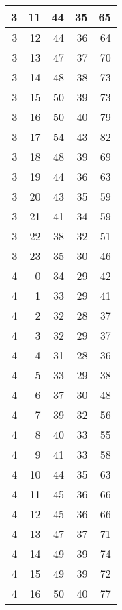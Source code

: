 \begin{longtable}{|r|r|r|r|r|}
    3     & 11    & 44    & 35    & 65 \\\hline
    3     & 12    & 44    & 36    & 64 \\\hline
    3     & 13    & 47    & 37    & 70 \\\hline
    3     & 14    & 48    & 38    & 73 \\\hline
    3     & 15    & 50    & 39    & 73 \\\hline
    3     & 16    & 50    & 40    & 79 \\\hline
    3     & 17    & 54    & 43    & 82 \\\hline
    3     & 18    & 48    & 39    & 69 \\\hline
    3     & 19    & 44    & 36    & 63 \\\hline
    3     & 20    & 43    & 35    & 59 \\\hline
    3     & 21    & 41    & 34    & 59 \\\hline
    3     & 22    & 38    & 32    & 51 \\\hline
    3     & 23    & 35    & 30    & 46 \\\hline
    4     & 0     & 34    & 29    & 42 \\\hline
    4     & 1     & 33    & 29    & 41 \\\hline
    4     & 2     & 32    & 28    & 37 \\\hline
    4     & 3     & 32    & 29    & 37 \\\hline
    4     & 4     & 31    & 28    & 36 \\\hline
    4     & 5     & 33    & 29    & 38 \\\hline
    4     & 6     & 37    & 30    & 48 \\\hline
    4     & 7     & 39    & 32    & 56 \\\hline
    4     & 8     & 40    & 33    & 55 \\\hline
    4     & 9     & 41    & 33    & 58 \\\hline
    4     & 10    & 44    & 35    & 63 \\\hline
    4     & 11    & 45    & 36    & 66 \\\hline
    4     & 12    & 45    & 36    & 66 \\\hline
    4     & 13    & 47    & 37    & 71 \\\hline
    4     & 14    & 49    & 39    & 74 \\\hline
    4     & 15    & 49    & 39    & 72 \\\hline
    4     & 16    & 50    & 40    & 77 \\\hline

\end{longtable}
